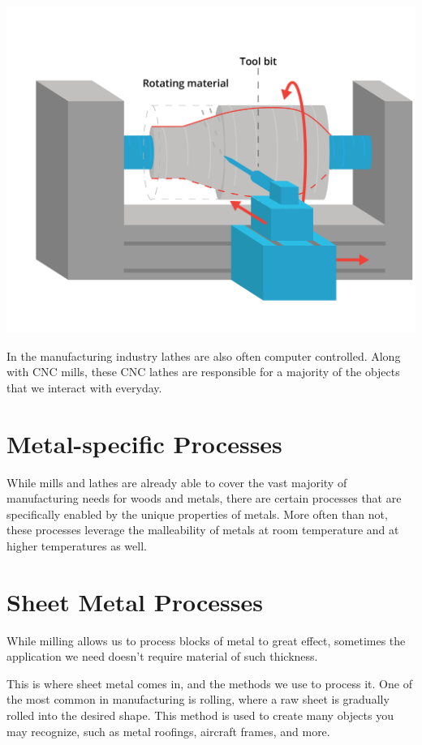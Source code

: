 \includegraphics[width=.75\textwidth]{lathe.png}


In the manufacturing industry lathes are also often computer controlled. Along with CNC mills, these CNC lathes are responsible for a majority of the objects that we interact with everyday.

\section{Metal-specific Processes}

While mills and lathes are already able to cover the vast majority of manufacturing needs for woods and metals, there are certain processes that are specifically enabled by the unique properties of metals. More often than not, these processes leverage the malleability of metals at room temperature and at higher temperatures as well.

\section{Sheet Metal Processes}

While milling allows us to process blocks of metal to great effect, sometimes the application we need doesn’t require material of such thickness.

This is where sheet metal comes in, and the methods we use to process it. One of the most common in manufacturing is rolling, where a raw sheet is gradually rolled into the desired shape. This method is used to create many objects you may recognize, such as metal roofings, aircraft frames, and more.


